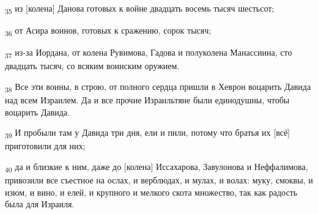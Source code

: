 \begin{tcolorbox}
\textsubscript{35} из [колена] Данова готовых к войне двадцать восемь тысяч шестьсот;
\end{tcolorbox}
\begin{tcolorbox}
\textsubscript{36} от Асира воинов, готовых к сражению, сорок тысяч;
\end{tcolorbox}
\begin{tcolorbox}
\textsubscript{37} из-за Иордана, от колена Рувимова, Гадова и полуколена Манассиина, сто двадцать тысяч, со всяким воинским оружием.
\end{tcolorbox}
\begin{tcolorbox}
\textsubscript{38} Все эти воины, в строю, от полного сердца пришли в Хеврон воцарить Давида над всем Израилем. Да и все прочие Израильтяне были единодушны, чтобы воцарить Давида.
\end{tcolorbox}
\begin{tcolorbox}
\textsubscript{39} И пробыли там у Давида три дня, ели и пили, потому что братья их [всё] приготовили для них;
\end{tcolorbox}
\begin{tcolorbox}
\textsubscript{40} да и близкие к ним, даже до [колена] Иссахарова, Завулонова и Неффалимова, привозили все съестное на ослах, и верблюдах, и мулах, и волах: муку, смоквы, и изюм, и вино, и елей, и крупного и мелкого скота множество, так как радость была для Израиля.
\end{tcolorbox}
